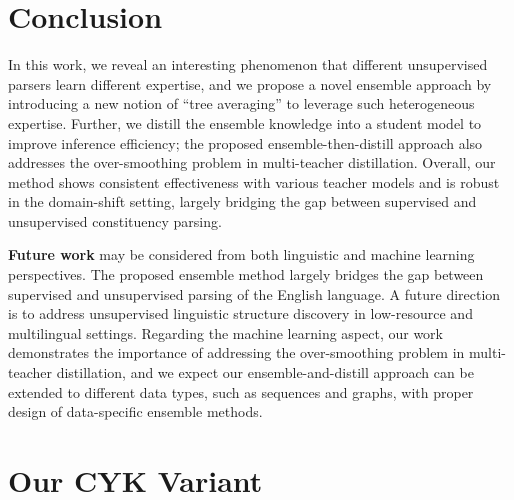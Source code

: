 \documentclass{article}
\begin{document}
\section{Conclusion}
In this work, we reveal an interesting phenomenon that different unsupervised parsers learn different expertise, and we propose a novel ensemble approach by introducing a new notion of ``tree averaging'' to leverage such heterogeneous expertise. Further, we distill the ensemble knowledge into a student model to improve inference efficiency; the proposed ensemble-then-distill approach also addresses the over-smoothing problem in multi-teacher distillation. Overall, our method shows consistent effectiveness with various teacher models and is robust in the domain-shift setting, largely bridging the gap between supervised and unsupervised constituency parsing.

\textbf{Future work} may be considered from both linguistic and machine learning perspectives. The proposed ensemble method largely bridges the gap between supervised and unsupervised parsing of the English language. A future direction is to address unsupervised linguistic structure discovery in low-resource and multilingual settings. Regarding the machine learning aspect, our work demonstrates the importance of addressing the over-smoothing problem in multi-teacher distillation, and we expect our ensemble-and-distill approach can be extended to different data types, such as sequences and graphs, with proper design of data-specific ensemble methods.

\newpage




\newpage

\appendix
\section{Our CYK Variant}
\label{apdx:CYKalgo}
\end{document}
